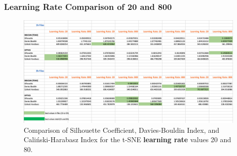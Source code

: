 \subsubsection{Learning Rate Comparison of 20 and 800}
\label{appendig:compareLearningRate20and800}

\begin{figure}[H]
  \centering
  \includegraphics[width=1\textwidth]{./images/tsneParametersTest/learningRate/learningRateEvaluationScoresAverageDetailed4.png}
  \caption{Comparison of Silhouette Coefficient, Davies-Bouldin Index, and Caliński-Harabasz Index for the t-SNE \textbf{learning rate} values 20 and 80.}
  \label{figure:learningRateEvaluationScoresAverageDetailed4}
\end{figure}

